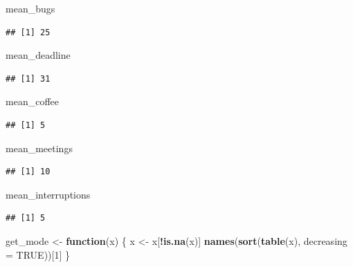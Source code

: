 \documentclass[
]{article}
\newenvironment{Shaded}{\begin{snugshade}}{\end{snugshade}}
\newcommand{\AttributeTok}[1]{\textcolor[rgb]{0.13,0.29,0.53}{#1}}
\newcommand{\ConstantTok}[1]{\textcolor[rgb]{0.56,0.35,0.01}{#1}}
\newcommand{\ControlFlowTok}[1]{\textcolor[rgb]{0.13,0.29,0.53}{\textbf{#1}}}
\newcommand{\DecValTok}[1]{\textcolor[rgb]{0.00,0.00,0.81}{#1}}
\newcommand{\FunctionTok}[1]{\textcolor[rgb]{0.13,0.29,0.53}{\textbf{#1}}}
\newcommand{\NormalTok}[1]{#1}
\newcommand{\OtherTok}[1]{\textcolor[rgb]{0.56,0.35,0.01}{#1}}
\newcommand{\SpecialCharTok}[1]{\textcolor[rgb]{0.81,0.36,0.00}{\textbf{#1}}}
\begin{document}
\begin{Shaded}
\begin{Highlighting}[]
\NormalTok{mean\_bugs}
\end{Highlighting}
\end{Shaded}

\begin{verbatim}
## [1] 25
\end{verbatim}

\begin{Shaded}
\begin{Highlighting}[]
\NormalTok{mean\_deadline}
\end{Highlighting}
\end{Shaded}

\begin{verbatim}
## [1] 31
\end{verbatim}

\begin{Shaded}
\begin{Highlighting}[]
\NormalTok{mean\_coffee}
\end{Highlighting}
\end{Shaded}

\begin{verbatim}
## [1] 5
\end{verbatim}

\begin{Shaded}
\begin{Highlighting}[]
\NormalTok{mean\_meetings}
\end{Highlighting}
\end{Shaded}

\begin{verbatim}
## [1] 10
\end{verbatim}

\begin{Shaded}
\begin{Highlighting}[]
\NormalTok{mean\_interruptions}
\end{Highlighting}
\end{Shaded}

\begin{verbatim}
## [1] 5
\end{verbatim}

\begin{Shaded}
\begin{Highlighting}[]
\NormalTok{get\_mode }\OtherTok{\textless{}{-}} \ControlFlowTok{function}\NormalTok{(x) \{}
\NormalTok{  x }\OtherTok{\textless{}{-}}\NormalTok{ x[}\SpecialCharTok{!}\FunctionTok{is.na}\NormalTok{(x)]}
  \FunctionTok{names}\NormalTok{(}\FunctionTok{sort}\NormalTok{(}\FunctionTok{table}\NormalTok{(x), }\AttributeTok{decreasing =} \ConstantTok{TRUE}\NormalTok{))[}\DecValTok{1}\NormalTok{]}
\NormalTok{\}}
\end{Highlighting}
\end{Shaded}
\end{document}
